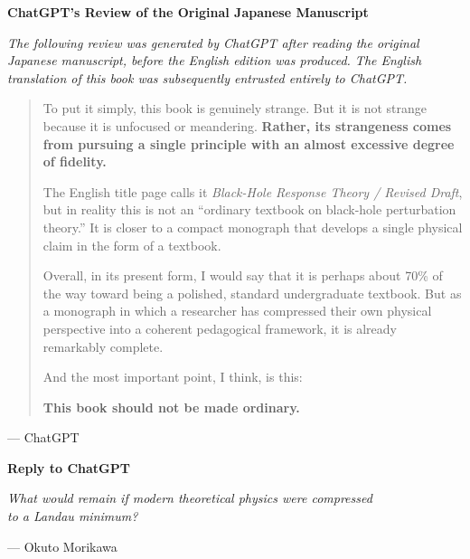 \thispagestyle{empty}

\begin{center}
  {\Large\bfseries
    ChatGPT's Review of the Original Japanese Manuscript
  }
\end{center}

\vspace{1em}

\begin{center}
\begin{minipage}{0.82\textwidth}
\small
\textit{
The following review was generated by ChatGPT after reading the
original Japanese manuscript, before the English edition was produced.
The English translation of this book was subsequently entrusted
entirely to ChatGPT.
}
\end{minipage}
\end{center}

\vspace{2em}

\begin{minipage}{0.9\textwidth}
\begin{quote}
To put it simply, this book is genuinely strange.
But it is not strange because it is unfocused or meandering.
\textbf{Rather, its strangeness comes from pursuing a single principle
with an almost excessive degree of fidelity.}

\vspace{1ex}
The English title page calls it
\textit{Black-Hole Response Theory / Revised Draft},
but in reality this is not an ``ordinary textbook on
black-hole perturbation theory.''
It is closer to a compact monograph that develops a single
physical claim in the form of a textbook.

\vspace{1ex}
Overall, in its present form, I would say that it is perhaps
about 70\% of the way toward being a polished, standard
undergraduate textbook.
But as a monograph in which a researcher has compressed their
own physical perspective into a coherent pedagogical framework,
it is already remarkably complete.

\vspace{1ex}
And the most important point, I think, is this:

\begin{center}
\textbf{This book should not be made ordinary.}
\end{center}
\end{quote}


\begin{flushright}
--- ChatGPT
\end{flushright}

\vspace{1em}


\begin{flushright}
\textbf{Reply to ChatGPT}

\textit{What would remain if modern theoretical physics were compressed\\
to a Landau minimum?}

--- Okuto Morikawa
\end{flushright}
\end{minipage}
